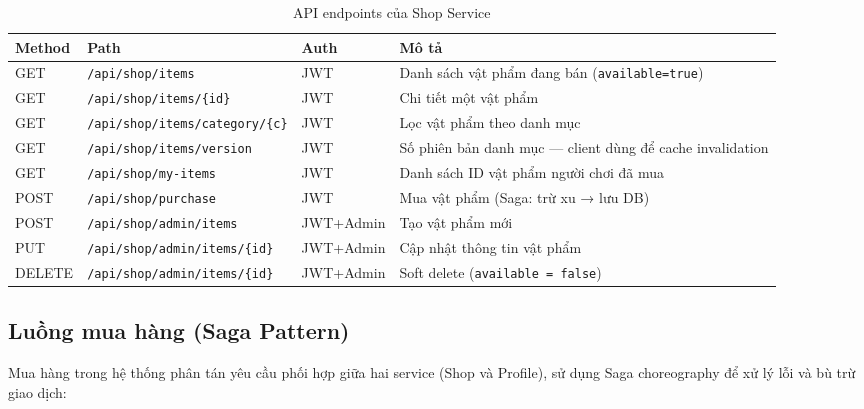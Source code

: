 \documentclass[12pt,a4paper]{report}
\begin{document}
\begin{table}[H]
\centering
\caption{API endpoints của Shop Service}
\label{tab:shopapi}
\begin{tabularx}{\textwidth}{lllX}
\toprule
\textbf{Method} & \textbf{Path} & \textbf{Auth} & \textbf{Mô tả} \\
\midrule
GET    & \texttt{/api/shop/items}             & JWT       & Danh sách vật phẩm đang bán (\texttt{available=true}) \\
GET    & \texttt{/api/shop/items/\{id\}}      & JWT       & Chi tiết một vật phẩm \\
GET    & \texttt{/api/shop/items/category/\{c\}} & JWT   & Lọc vật phẩm theo danh mục \\
GET    & \texttt{/api/shop/items/version}     & JWT       & Số phiên bản danh mục --- client dùng để cache invalidation \\
GET    & \texttt{/api/shop/my-items}          & JWT       & Danh sách ID vật phẩm người chơi đã mua \\
POST   & \texttt{/api/shop/purchase}          & JWT       & Mua vật phẩm (Saga: trừ xu → lưu DB) \\
POST   & \texttt{/api/shop/admin/items}       & JWT+Admin & Tạo vật phẩm mới \\
PUT    & \texttt{/api/shop/admin/items/\{id\}} & JWT+Admin & Cập nhật thông tin vật phẩm \\
DELETE & \texttt{/api/shop/admin/items/\{id\}} & JWT+Admin & Soft delete (\texttt{available = false}) \\
\bottomrule
\end{tabularx}
\end{table}

\subsection{Luồng mua hàng (Saga Pattern)}

Mua hàng trong hệ thống phân tán yêu cầu phối hợp giữa hai service (Shop và Profile), sử dụng Saga choreography để xử lý lỗi và bù trừ giao dịch:
\end{document}
